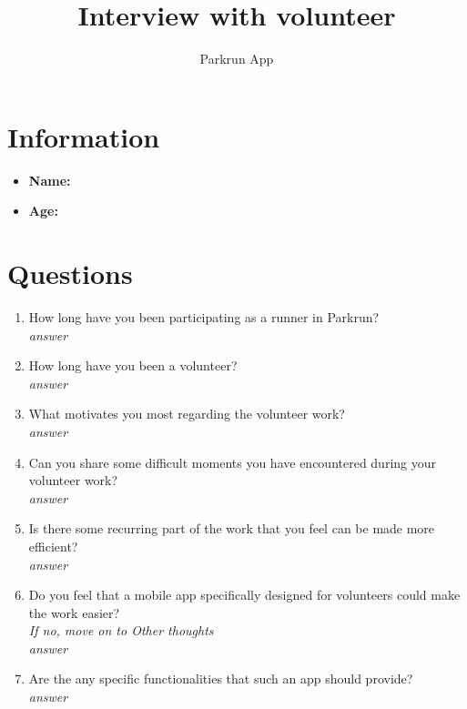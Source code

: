 \documentclass{article}
\title{\textbf{Interview with volunteer}}
\author{Parkrun App}
\date{}
\begin{document}
\maketitle
\thispagestyle{empty}
\section*{Information}
\begin{itemize}[label=]
    \item \textbf{Name:} 
    \item \textbf{Age:} 
\end{itemize}

\section*{Questions}
\begin{enumerate}[label=\textbf{Question \arabic*:}]
    \item How long have you been participating as a runner in Parkrun?\\
        \textit{answer}
    \item How long have you been a volunteer?\\
        \textit{answer}
    \item What motivates you most regarding the volunteer work?\\
        \textit{answer}
    \item Can you share some difficult moments you have encountered during your volunteer work?\\
        \textit{answer}
    \item Is there some recurring part of the work that you feel can be made more efficient?\\
        \textit{answer}
    \item Do you feel that a mobile app specifically designed for volunteers could make the work easier?\\
    \textit{If no, move on to Other thoughts}\\
        \textit{answer}
    \item Are the any specific functionalities that such an app should provide?\\
        \textit{answer}
\end{enumerate}

\newpage
\end{document}
